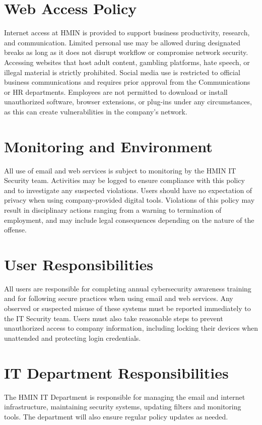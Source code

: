 \section{Web Access Policy}

Internet access at HMIN is provided to support business productivity, research, and communication. Limited personal use may be allowed during designated breaks as long as it does not disrupt workflow or compromise network security. Accessing websites that host adult content, gambling platforms, hate speech, or illegal material is strictly prohibited. Social media use is restricted to official business communications and requires prior approval from the Communications or HR departments. Employees are not permitted to download or install unauthorized software, browser extensions, or plug-ins under any circumstances, as this can create vulnerabilities in the company’s network.

\section{Monitoring and Environment}

All use of email and web services is subject to monitoring by the HMIN IT Security team. Activities may be logged to ensure compliance with this policy and to investigate any suspected violations. Users should have no expectation of privacy when using company-provided digital tools. Violations of this policy may result in disciplinary actions ranging from a warning to termination of employment, and may include legal consequences depending on the nature of the offense.

\section{User Responsibilities}

All users are responsible for completing annual cybersecurity awareness training and for following secure practices when using email and web services. Any observed or suspected misuse of these systems must be reported immediately to the IT Security team. Users must also take reasonable steps to prevent unauthorized access to company information, including locking their devices when unattended and protecting login credentials.

\section{IT Department Responsibilities}

The HMIN IT Department is responsible for managing the email and internet infrastructure, maintaining security systems, updating filters and monitoring tools. The department will also ensure regular policy updates as needed.
